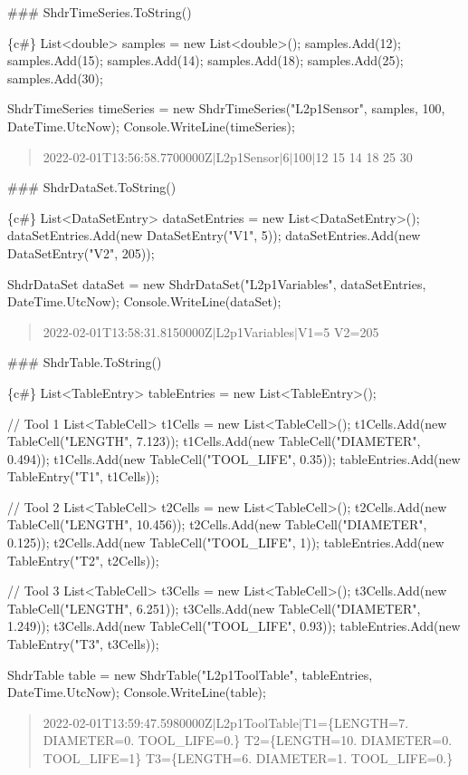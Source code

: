 \#\#\# Shdr\+Time\+Series.\+To\+String() 
\begin{DoxyCode}
\{c#\}
List<double> samples = new List<double>();
samples.Add(12);
samples.Add(15);
samples.Add(14);
samples.Add(18);
samples.Add(25);
samples.Add(30);

ShdrTimeSeries timeSeries = new ShdrTimeSeries("L2p1Sensor", samples, 100, DateTime.UtcNow);
Console.WriteLine(timeSeries);
\end{DoxyCode}
 \begin{quote}
2022-\/02-\/01\+T13\+:56\+:58.\+7700000Z$\vert$\+L2p1\+Sensor$\vert$6$\vert$100$\vert$12 15 14 18 25 30 \end{quote}


\#\#\# Shdr\+Data\+Set.\+To\+String() 
\begin{DoxyCode}
\{c#\}
List<DataSetEntry> dataSetEntries = new List<DataSetEntry>();
dataSetEntries.Add(new DataSetEntry("V1", 5));
dataSetEntries.Add(new DataSetEntry("V2", 205));

ShdrDataSet dataSet = new ShdrDataSet("L2p1Variables", dataSetEntries, DateTime.UtcNow);
Console.WriteLine(dataSet);
\end{DoxyCode}
 \begin{quote}
2022-\/02-\/01\+T13\+:58\+:31.\+8150000Z$\vert$\+L2p1\+Variables$\vert$\+V1=5 V2=205 \end{quote}


\#\#\# Shdr\+Table.\+To\+String() 
\begin{DoxyCode}
\{c#\}
List<TableEntry> tableEntries = new List<TableEntry>();

// Tool 1
List<TableCell> t1Cells = new List<TableCell>();
t1Cells.Add(new TableCell("LENGTH", 7.123));
t1Cells.Add(new TableCell("DIAMETER", 0.494));
t1Cells.Add(new TableCell("TOOL\_LIFE", 0.35));
tableEntries.Add(new TableEntry("T1", t1Cells));

// Tool 2
List<TableCell> t2Cells = new List<TableCell>();
t2Cells.Add(new TableCell("LENGTH", 10.456));
t2Cells.Add(new TableCell("DIAMETER", 0.125));
t2Cells.Add(new TableCell("TOOL\_LIFE", 1));
tableEntries.Add(new TableEntry("T2", t2Cells));

// Tool 3
List<TableCell> t3Cells = new List<TableCell>();
t3Cells.Add(new TableCell("LENGTH", 6.251));
t3Cells.Add(new TableCell("DIAMETER", 1.249));
t3Cells.Add(new TableCell("TOOL\_LIFE", 0.93));
tableEntries.Add(new TableEntry("T3", t3Cells));

ShdrTable table = new ShdrTable("L2p1ToolTable", tableEntries, DateTime.UtcNow);
Console.WriteLine(table);
\end{DoxyCode}
 \begin{quote}
2022-\/02-\/01\+T13\+:59\+:47.\+5980000Z$\vert$\+L2p1\+Tool\+Table$\vert$\+T1=\{L\+E\+N\+G\+TH=7. D\+I\+A\+M\+E\+T\+ER=0. T\+O\+O\+L\+\_\+\+L\+I\+FE=0.\} T2=\{L\+E\+N\+G\+TH=10. D\+I\+A\+M\+E\+T\+ER=0. T\+O\+O\+L\+\_\+\+L\+I\+FE=1\} T3=\{L\+E\+N\+G\+TH=6. D\+I\+A\+M\+E\+T\+ER=1. T\+O\+O\+L\+\_\+\+L\+I\+FE=0.\}\end{quote}
